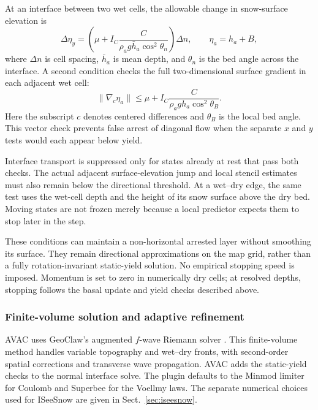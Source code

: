 \documentclass[11pt,a4paper]{article}
\begin{document}
At an interface between two wet cells, the allowable change in snow-surface
elevation is
\begin{equation}
  \Delta\eta_y=
  \left(\mu+I_C\frac{C}{\rho_a g\bar h_a\cos^2\theta_n}\right)\Delta n,
  \qquad \eta_a=h_a+B,
  \label{eq:avac-interface-yield}
\end{equation}
where $\Delta n$ is cell spacing, $\bar h_a$ is mean depth, and $\theta_n$
is the bed angle across the interface. A second condition checks the full
two-dimensional surface gradient in each adjacent wet cell:
\begin{equation}
  \lVert\nabla_c\eta_a\rVert
  \leq \mu+I_C\frac{C}{\rho_a g h_a\cos^2\theta_B}.
  \label{eq:avac-vector-interface-yield}
\end{equation}
Here the subscript $c$ denotes centered differences and $\theta_B$ is the
local bed angle. This vector check prevents false arrest of diagonal flow
when the separate $x$ and $y$ tests would each appear below yield.

Interface transport is suppressed only for states already at rest that pass
both checks. The actual adjacent surface-elevation jump and local stencil
estimates must also remain below the directional threshold. At a wet--dry
edge, the same test uses the wet-cell depth and the height of its snow surface
above the dry bed. Moving states are not frozen merely because a local
predictor expects them to stop later in the step.

These conditions can maintain a non-horizontal arrested layer without
smoothing its surface. They remain directional approximations on the map
grid, rather than a fully rotation-invariant static-yield solution. No
empirical stopping speed is imposed. Momentum is set to zero in numerically
dry cells; at resolved depths, stopping follows the basal update and yield
checks described above.

\subsubsection{Finite-volume solution and adaptive refinement}

AVAC uses GeoClaw's augmented $f$-wave Riemann solver
\citep{George2008,BergerEtAl2011}. This finite-volume method handles variable
topography and wet--dry fronts, with second-order spatial corrections and
transverse wave propagation. AVAC adds the static-yield checks to the normal
interface solve. The plugin defaults to the Minmod limiter for Coulomb and
Superbee for the Voellmy laws. The separate numerical choices used for
ISeeSnow are given in Sect.~\ref{sec:iseesnow}.
\end{document}
